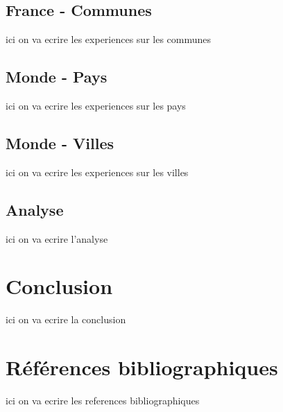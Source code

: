 \documentclass {article}
\begin{document}
\subsection {France - Communes}\label{france}
ici on va ecrire les experiences sur les communes

\subsection {Monde - Pays}\label{mondePays}
ici on va ecrire les experiences sur les pays

\subsection {Monde - Villes}\label{mondeVilles}
ici on va ecrire les experiences sur les villes

\subsection {Analyse}\label{analyse}
ici on va ecrire l'analyse

\section {Conclusion}
ici on va ecrire la conclusion

\section {Références bibliographiques}
ici on va ecrire les references bibliographiques
\end{document}

